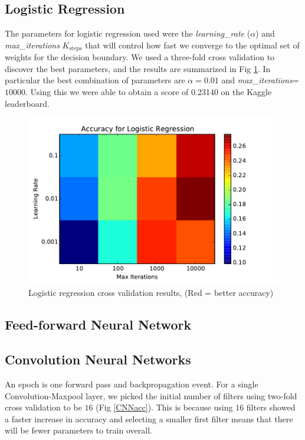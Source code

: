 \documentclass[conference]{IEEEtran}
\begin{document}
\subsection{Logistic Regression}
The parameters for logistic regression used were the \emph{learning\_rate} ($\alpha$) and \emph{max\_iterations} $K_{\text{steps}}$ that will control how fast we converge to the optimal set of weights for the decision boundary. We used a three-fold cross validation to discover the best parameters, and the results are summarized in Fig \ref{LR_accuracy}. In particular the best combination of parameters are $\alpha=0.01$ and \emph{max\_iterations}=$10000$. Using this we were able to obtain a score of 0.23140 on the Kaggle leaderboard.

\begin{figure}[h]
	\label{LR_accuracy}
	\centering
	\includegraphics[scale=0.50]{LR_accuracy.pdf}
	\caption{Logistic regression cross validation results, (Red = better accuracy)}
\end{figure}

\subsection{Feed-forward Neural Network}


\subsection{Convolution Neural Networks}
An epoch is one forward pass and backpropagation event. For a single Convolution-Maxpool layer, we picked the initial number of filters using two-fold cross validation to be $16$ (Fig \ref{CNNacc}). This is because using $16$ filters showed a faster increase in accuracy and selecting a smaller first filter means that there will be fewer parameters to train overall.
\end{document}
